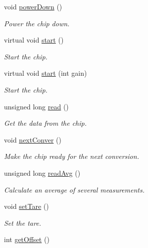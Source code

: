 \begin{DoxyCompactItemize}
void \hyperlink{classhx711_a3089898e9aad597a5d985ce2f8a9f5b8}{power\+Down} ()
\begin{DoxyCompactList}\small\item\em Power the chip down. \end{DoxyCompactList}\item 
virtual void \hyperlink{classhx711_a2f9adaee6d128aec8ac6b9016f403203}{start} ()
\begin{DoxyCompactList}\small\item\em Start the chip. \end{DoxyCompactList}\item 
virtual void \hyperlink{classhx711_aee8f8962d06e50888aa6f689c8d5fff2}{start} (int gain)
\begin{DoxyCompactList}\small\item\em Start the chip. \end{DoxyCompactList}\item 
unsigned long \hyperlink{classhx711_a5dc85e1232264d571512f75b6bad90d5}{read} ()
\begin{DoxyCompactList}\small\item\em Get the data from the chip. \end{DoxyCompactList}\item 
void \hyperlink{classhx711_adf28a62a6d06f522614694ab4df96f3f}{next\+Conver} ()
\begin{DoxyCompactList}\small\item\em Make the chip ready for the next conversion. \end{DoxyCompactList}\item 
\mbox{\label{classhx711_adba17783420dfd33e3354c259c0849a4}} 
unsigned long \hyperlink{classhx711_adba17783420dfd33e3354c259c0849a4}{read\+Avg} ()
\begin{DoxyCompactList}\small\item\em Calculate an average of several measurements. \end{DoxyCompactList}\item 
void \hyperlink{classhx711_a5e40d399e913785d6e7fe7f247c6fe2a}{set\+Tare} ()
\begin{DoxyCompactList}\small\item\em Set the tare. \end{DoxyCompactList}\item 
\mbox{\label{classhx711_aabfa5988bb6dd2e9110055ccd0064304}} 
int \hyperlink{classhx711_aabfa5988bb6dd2e9110055ccd0064304}{get\+Offset} ()

\end{DoxyCompactItemize}
